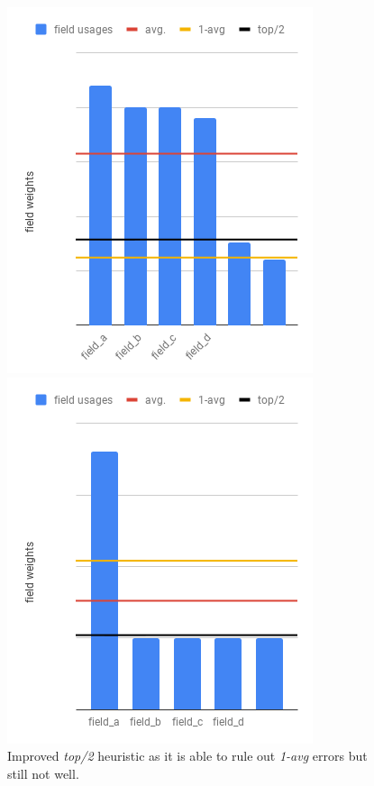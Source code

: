 \begin{figure}[!ht]
	\begin{minipage}[b]{0.5\linewidth}
		\centering
		\includegraphics[width=\textwidth,height=.8\textwidth]{PICs/top_2}	
	\end{minipage}
	\hspace{0.5cm}
	\begin{minipage}[b]{0.5\linewidth}
		\centering
		\includegraphics[width=\textwidth,height=.8\textwidth]{PICs/top_2_bad}
	\end{minipage}
	\caption{Improved \textit{top/2} heuristic as it is able to rule out \textit{1-avg} errors but still not well.}\label{top_2}
\end{figure}
